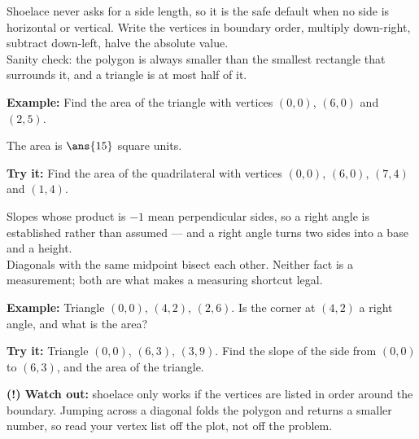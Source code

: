 \documentclass[12pt]{article}
\begin{document}
\begin{formulabox}
Shoelace never asks for a side length, so it is the safe default when no side
is horizontal or vertical. Write the vertices in boundary order, multiply
down-right, subtract down-left, halve the absolute value.\\[3pt]
Sanity check: the polygon is always smaller than the smallest rectangle that
surrounds it, and a triangle is at most half of it.
\end{formulabox}

\begin{examplebox}
\textbf{Example:} Find the area of the triangle with vertices $(0,0)$, $(6,0)$
and $(2,5)$.

The area is $\ans{15}$ square units.
\end{examplebox}

\begin{tryitbox}
\textbf{Try it:} Find the area of the quadrilateral with vertices $(0,0)$,
$(6,0)$, $(7,4)$ and $(1,4)$.\\[2pt]
\end{tryitbox}


\begin{formulabox}
Slopes whose product is $-1$ mean perpendicular sides, so a right angle is
established rather than assumed --- and a right angle turns two sides into a
base and a height.\\[3pt]
Diagonals with the same midpoint bisect each other. Neither fact is a
measurement; both are what makes a measuring shortcut legal.
\end{formulabox}

\begin{examplebox}
\textbf{Example:} Triangle $(0,0)$, $(4,2)$, $(2,6)$. Is the corner at $(4,2)$
a right angle, and what is the area?
\end{examplebox}

\begin{tryitbox}
\textbf{Try it:} Triangle $(0,0)$, $(6,3)$, $(3,9)$. Find the slope of the side
from $(0,0)$ to $(6,3)$, and the area of the triangle.\\[2pt]
\end{tryitbox}

\begin{watchoutbox}
\textbf{(!) Watch out:} shoelace only works if the vertices are listed in order
around the boundary. Jumping across a diagonal folds the polygon and returns a
smaller number, so read your vertex list off the plot, not off the problem.
\end{watchoutbox}
\end{document}
